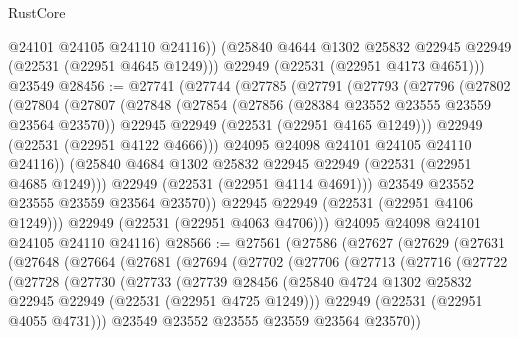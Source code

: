 \begin{lexlean}{RustCore}
\begin{coremodule}
          @24101
          @24105
          @24110
          @24116))
      (@25840 @4644 @1302 @25832 @22945 @22949 (@22531 (@22951 @4645 @1249)))
      @22949
      (@22531 (@22951 @4173 @4651)))
    @23549
@28456 := @27741
    (@27744
      (@27785
        (@27791
          (@27793
            (@27796
              (@27802
                (@27804
                  (@27807
                    (@27848
                      (@27854
                        (@27856 (@28384 @23552 @23555 @23559 @23564 @23570))
                        @22945
                        @22949
                        (@22531 (@22951 @4165 @1249)))
                      @22949
                      (@22531 (@22951 @4122 @4666)))
                    @24095
                    @24098
                    @24101
                    @24105
                    @24110
                    @24116))
                (@25840 @4684 @1302 @25832 @22945 @22949 (@22531 (@22951 @4685 @1249)))
                @22949
                (@22531 (@22951 @4114 @4691)))
              @23549
              @23552
              @23555
              @23559
              @23564
              @23570))
          @22945
          @22949
          (@22531 (@22951 @4106 @1249)))
        @22949
        (@22531 (@22951 @4063 @4706)))
      @24095
      @24098
      @24101
      @24105
      @24110
      @24116)
@28566 := @27561
    (@27586
      (@27627
        (@27629
          (@27631
            (@27648
              (@27664
                (@27681
                  (@27694
                    (@27702
                      (@27706
                        (@27713
                          (@27716
                            (@27722
                              (@27728
                                (@27730
                                  (@27733
                                    (@27739
                                      @28456
                                      (@25840
                                        @4724
                                        @1302
                                        @25832
                                        @22945
                                        @22949
                                        (@22531 (@22951 @4725 @1249)))
                                      @22949
                                      (@22531 (@22951 @4055 @4731)))
                                    @23549
                                    @23552
                                    @23555
                                    @23559
                                    @23564
                                    @23570))

\end{coremodule}
\end{lexlean}
